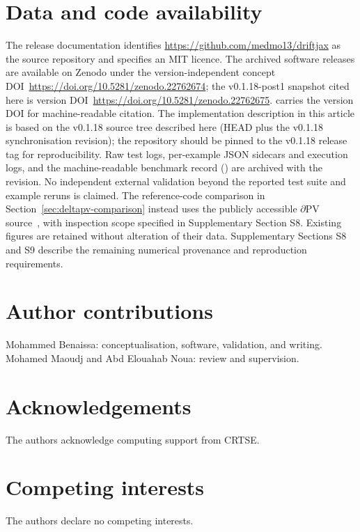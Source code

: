 \section*{Data and code availability}
The release documentation identifies
\url{https://github.com/medmo13/driftjax} as the source repository and
specifies an MIT licence. The archived software releases are available on Zenodo under the
version-independent concept DOI~\url{https://doi.org/10.5281/zenodo.22762674};
the v0.1.18-post1 snapshot cited here is version DOI~\url{https://doi.org/10.5281/zenodo.22762675}.
 carries the version DOI for machine-readable citation. The implementation description in this article
is based on the v0.1.18 source tree described here (HEAD 
plus the v0.1.18 synchronisation revision); the repository should be
pinned to the v0.1.18 release tag for reproducibility. Raw test logs,
per-example JSON sidecars and execution logs, and the machine-readable
benchmark record ()
are archived with the revision. No independent external validation
beyond the reported test suite and example reruns is claimed.
The reference-code comparison in Section~\ref{sec:deltapv-comparison}
instead uses the publicly accessible
$\partial\mathrm{PV}$ source~\cite{deltapvsource}, with inspection scope
specified in Supplementary Section S8. Existing figures are retained
without alteration of their data.
Supplementary Sections S8 and S9 describe the remaining numerical
provenance and reproduction requirements.

\section*{Author contributions}
Mohammed Benaissa: conceptualisation, software, validation, and writing.
Mohamed Maoudj and Abd Elouahab Noua: review and supervision.

\section*{Acknowledgements}
The authors acknowledge computing support from CRTSE.

\section*{Competing interests}
The authors declare no competing interests.